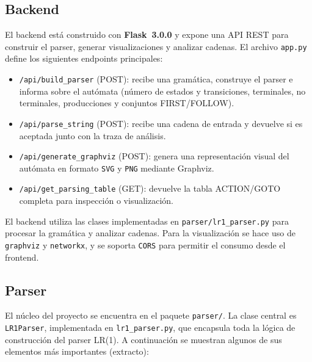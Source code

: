 \documentclass[12pt,a4paper]{article}
\begin{document}
\subsection{Backend}

El backend está construido con \textbf{Flask~3.0.0} y expone una API REST para construir el parser, generar visualizaciones y analizar cadenas.  El archivo \texttt{app.py} define los siguientes endpoints principales:
\begin{itemize}
  \item \verb|/api/build_parser| (POST): recibe una gramática, construye el parser e informa sobre el autómata (número de estados y transiciones, terminales, no terminales, producciones y conjuntos FIRST/FOLLOW).
  \item \verb|/api/parse_string| (POST): recibe una cadena de entrada y devuelve si es aceptada junto con la traza de análisis.
  \item \verb|/api/generate_graphviz| (POST): genera una representación visual del autómata en formato \texttt{SVG} y \texttt{PNG} mediante Graphviz.
  \item \verb|/api/get_parsing_table| (GET): devuelve la tabla ACTION/GOTO completa para inspección o visualización.
\end{itemize}
El backend utiliza las clases implementadas en \texttt{parser/lr1\_parser.py} para procesar la gramática y analizar cadenas.  Para la visualización se hace uso de \texttt{graphviz} y \texttt{networkx}, y se soporta \texttt{CORS} para permitir el consumo desde el frontend.

\subsection{Parser}

El núcleo del proyecto se encuentra en el paquete \texttt{parser/}.  La clase central es \texttt{LR1Parser}, implementada en \verb|lr1_parser.py|, que encapsula toda la lógica de construcción del parser LR(1).  A continuación se muestran algunos de sus elementos más importantes (extracto):
\end{document}
